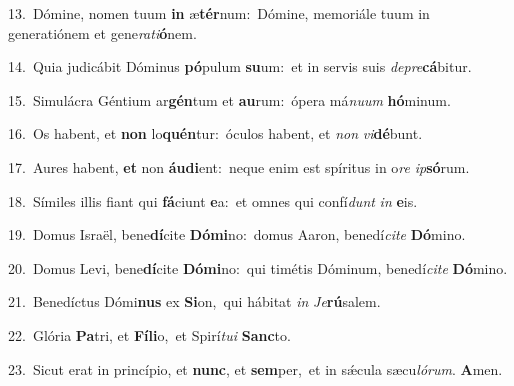 {\numbfont\textcolor{\numbcolor}{13.}}~Dómine, nomen tuum \textbf{in} æ\-\textbf{tér}\-num:~\star Dómine, memoriále tuum in generatiónem et gene\-\textit{ra}\-\textit{ti}\textbf{ó}nem.\par
{\numbfont\textcolor{\numbcolor}{14.}}~Quia judicábit Dóminus \textbf{pó}\-pulum \textbf{su}\-um:~\star et in servis suis \textit{de}\-\textit{pre}\textbf{cá}bitur.\par
{\numbfont\textcolor{\numbcolor}{15.}}~Simulácra Géntium ar\-\textbf{gén}\-tum et \textbf{au}\-rum:~\star ópera má\-\textit{nu}\-\textit{um} \textbf{hó}\-minum.\par
{\numbfont\textcolor{\numbcolor}{16.}}~Os habent, et \textbf{non} lo\-\textbf{quén}\-tur:~\star óculos habent, et \textit{non} \textit{vi}\-\textbf{dé}bunt.\par
{\numbfont\textcolor{\numbcolor}{17.}}~Aures habent, \textbf{et} non \textbf{áu}\-\textbf{di}ent:~\star neque enim est spíritus in o\textit{re} \textit{ip}\-\textbf{só}rum.\par
{\numbfont\textcolor{\numbcolor}{18.}}~Símiles illis fiant qui \textbf{fá}\-ciunt \textbf{e}\-a:~\star et omnes qui confí\textit{dunt} \textit{in} \textbf{e}\-is.\par
{\numbfont\textcolor{\numbcolor}{19.}}~Domus Israël, bene\-\textbf{dí}\-cite \textbf{Dó}\-\textbf{mi}no:~\star domus Aaron, benedí\-\textit{ci}\-\textit{te} \textbf{Dó}\-mino.\par
{\numbfont\textcolor{\numbcolor}{20.}}~Domus Levi, bene\-\textbf{dí}\-cite \textbf{Dó}\-\textbf{mi}no:~\star qui timétis Dóminum, benedí\-\textit{ci}\-\textit{te} \textbf{Dó}\-mino.\par
{\numbfont\textcolor{\numbcolor}{21.}}~Benedíctus Dómi\textbf{nus} ex \textbf{Si}\-on,~\star qui hábitat \textit{in} \textit{Je}\-\textbf{rú}salem.\par
{\numbfont\textcolor{\numbcolor}{22.}}~Glória \textbf{Pa}\-tri, et \textbf{Fí}\-\textbf{li}o,~\star et Spirí\-\textit{tu}\-\textit{i} \textbf{Sanc}\-to.\par
{\numbfont\textcolor{\numbcolor}{23.}}~Sicut erat in princípio, et \textbf{nunc}\-, et \textbf{sem}\-per,~\star et in sǽcula sæcu\-\textit{ló}\-\textit{rum}. \textbf{A}\-men.\par
